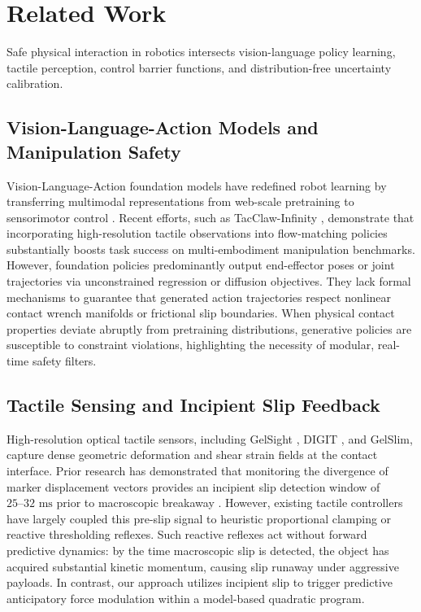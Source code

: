 \section{Related Work}
\label{sec:related_work}

Safe physical interaction in robotics intersects vision-language policy learning, tactile perception, control barrier functions, and distribution-free uncertainty calibration.

\subsection{Vision-Language-Action Models and Manipulation Safety}
Vision-Language-Action foundation models have redefined robot learning by transferring multimodal representations from web-scale pretraining to sensorimotor control \cite{openvla2024,pi02024}. Recent efforts, such as TacClaw-Infinity \cite{tacclaw2026infinity}, demonstrate that incorporating high-resolution tactile observations into flow-matching policies substantially boosts task success on multi-embodiment manipulation benchmarks. However, foundation policies predominantly output end-effector poses or joint trajectories via unconstrained regression or diffusion objectives. They lack formal mechanisms to guarantee that generated action trajectories respect nonlinear contact wrench manifolds or frictional slip boundaries. When physical contact properties deviate abruptly from pretraining distributions, generative policies are susceptible to constraint violations, highlighting the necessity of modular, real-time safety filters.

\subsection{Tactile Sensing and Incipient Slip Feedback}
High-resolution optical tactile sensors, including GelSight \cite{yuan2017gelsight}, DIGIT \cite{lambeta2020digit}, and GelSlim, capture dense geometric deformation and shear strain fields at the contact interface. Prior research has demonstrated that monitoring the divergence of marker displacement vectors provides an incipient slip detection window of $25\text{--}32\text{ ms}$ prior to macroscopic breakaway \cite{pandas2024incipient,shear2025grasp}. However, existing tactile controllers have largely coupled this pre-slip signal to heuristic proportional clamping or reactive thresholding reflexes. Such reactive reflexes act without forward predictive dynamics: by the time macroscopic slip is detected, the object has acquired substantial kinetic momentum, causing slip runaway under aggressive payloads. In contrast, our approach utilizes incipient slip to trigger predictive anticipatory force modulation within a model-based quadratic program.

